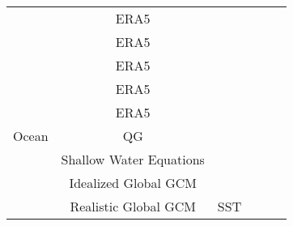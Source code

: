 \begin{table}[]
{\begin{tabular}{c|c|c|c|c|l}
           & ERA5                    &                                                               &                                                                 &          & \citep{weyn_sub-seasonal_2021}   \\
           & ERA5                    &                                                               &                                                                 &          & \citep{rasp_weatherbench_2020}   \\
           & ERA5                    &                                                               &                                                                 &          & \citep{rasp_data-driven_2021}    \\
           & ERA5                    &                                                               &                                                                 &          & \citep{keisler_forecasting_2022} \\
           & ERA5                    &                                                               &                                                                 &          & \citep{pathak_fourcastnet_2022}  \\
\hline
Ocean      & QG                      &                                                               &                                                                 &          & \citep{agarwal_comparison_2021}  \\
           & Shallow Water Equations &                                                               &                                                                 &          & \citep{chen_predicting_2021}     \\
           & Idealized Global GCM    &                                                               &                                                                 &          & \citep{furner_sensitivity_2022}  \\
           & Realistic Global GCM    & SST                                       &                                                                 &          & \citep{nadiga_reservoir_2021}    \\
\end{tabular}


}
\end{table}
